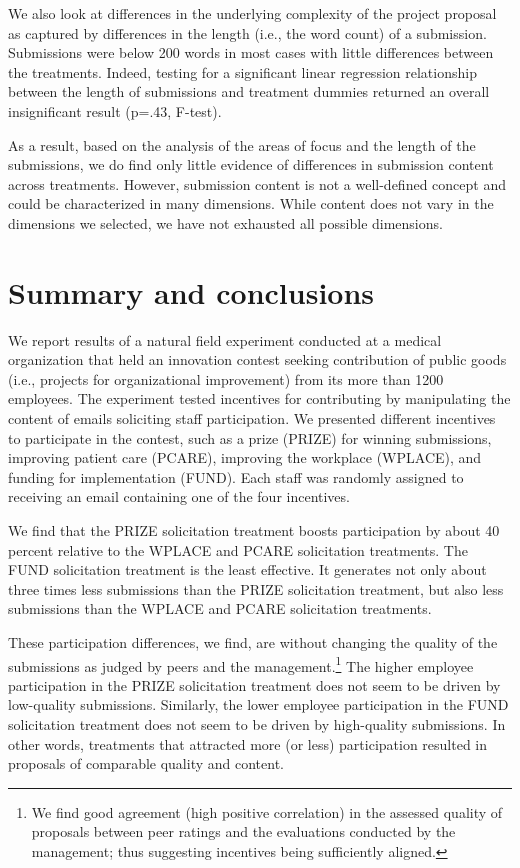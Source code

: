 \documentclass[12pt, titlepage]{article}
\begin{document}
We also look at differences in the underlying complexity of the project
proposal as captured by differences in the length (i.e., the word count)
of a submission. Submissions were below 200 words in most cases with
little differences between the treatments. Indeed, testing for a
significant linear regression relationship between the length of
submissions and treatment dummies returned an overall insignificant
result (p=.43, F-test).

As a result, based on the analysis of the areas of focus and the length
of the submissions, we do find only little evidence of differences in
submission content across treatments. However, submission content is not
a well-defined concept and could be characterized in many dimensions.
While content does not vary in the dimensions we selected, we have not
exhausted all possible dimensions.

\section{Summary and conclusions}\label{summary-and-conclusions}

We report results of a natural field experiment conducted at a medical
organization that held an innovation contest seeking contribution of
public goods (i.e., projects for organizational improvement) from its
more than 1200 employees. The experiment tested incentives for
contributing by manipulating the content of emails soliciting staff
participation. We presented different incentives to participate in the
contest, such as a prize (PRIZE) for winning submissions, improving
patient care (PCARE), improving the workplace (WPLACE), and funding for
implementation (FUND). Each staff was randomly assigned to receiving an
email containing one of the four incentives.

We find that the PRIZE solicitation treatment boosts participation by
about 40 percent relative to the WPLACE and PCARE solicitation
treatments. The FUND solicitation treatment is the least effective. It
generates not only about three times less submissions than the PRIZE
solicitation treatment, but also less submissions than the WPLACE and
PCARE solicitation treatments.

These participation differences, we find, are without changing the
quality of the submissions as judged by peers and the
management.\footnote{We find good agreement (high positive correlation)
  in the assessed quality of proposals between peer ratings and the
  evaluations conducted by the management; thus suggesting incentives
  being sufficiently aligned.} The higher employee participation in the
PRIZE solicitation treatment does not seem to be driven by low-quality
submissions. Similarly, the lower employee participation in the FUND
solicitation treatment does not seem to be driven by high-quality
submissions. In other words, treatments that attracted more (or less)
participation resulted in proposals of comparable quality and content.
\end{document}

